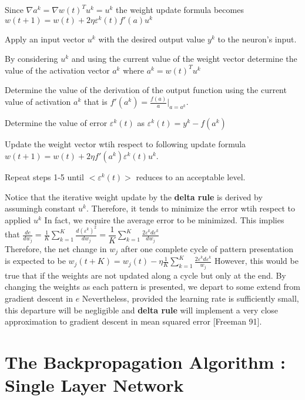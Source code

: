 \documentclass[12pt, a4paper, twoside]{book}
\begin{document}
Since $\nabla a^k = \nabla w(t)^Tu^k=u^k$ the weight update formula becomes $ w(t+1) = w(t) + 2\eta\varepsilon^k(t)f'(a)u^k$

\begin{steps}
    \item Apply an input vector $u^k$ with the desired output value $y^k$ to the neuron's input.
    \item By considering $u^k$ and using the current value of the weight vector determine the value of the activation vector $a^k$ where $a^k=w(t)^Tu^k$
    \item Determine the value of the derivation of the output function using the current value of activation $a^k$ that is $f'(a^k)= \frac{f(a)}{a}|_{a=a^k}$.
    \item Determine the value of error $\varepsilon^k(t)$ as $\varepsilon^k(t) = y^k - f(a^k)$
    \item Update the weight vector wtih respect to following update formula $w(t+1) = w(t) + 2\eta f'(a^k)\varepsilon^k(t)u^k$.
    \item Repeat steps 1-5 until $<\varepsilon^k(t)>$ reduces to an acceptable level.
\end{steps}

Notice that the iterative weight update by the \textbf{delta rule} is derived by assumingh constant $u^k$. Therefore, it tends to minimize the error wtih respect to applied $u^k$
In fact, we require the average error to be minimized. This implies that $\frac{de}{dw_j}=  \frac{1}{K} \sum_{k = 1}^{K}\frac{d(\varepsilon^k)^2}{dw_j} = \dfrac{1}{K} \sum_{k=1}^{K} \frac{2\varepsilon^kd\varepsilon^k}{dw_j}$ \\

Therefore, the net change in $w_j$ after one complete cycle of pattern presentation is expected to be
$w_j(t+K) = w_j(t) - \eta\frac{1}{K}\sum_{k=1}^{K}\frac{2\varepsilon^kd\varepsilon^k}{w_j}$
However, this would be true that if the weights are not updated along a cycle but only at the end. By changing the weights as each pattern is presented, we depart to some extend from gradient descent in $e$
Nevertheless, provided the learning rate is sufficiently small, this departure will be negligible and \textbf{delta rule} will implement a very close approximation to gradient descent in mean squared error [Freeman 91].

\section{The Backpropagation Algorithm : Single Layer Network}
\end{document}

